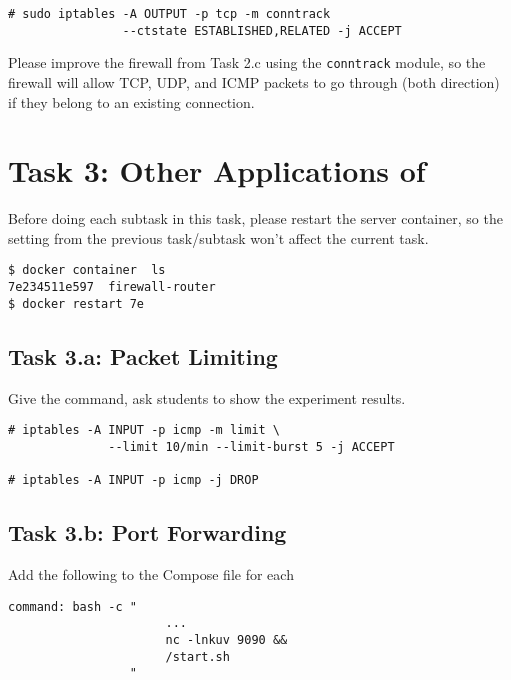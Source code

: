 \begin{lstlisting}
# sudo iptables -A OUTPUT -p tcp -m conntrack
                --ctstate ESTABLISHED,RELATED -j ACCEPT
\end{lstlisting}


Please improve the firewall from Task 2.c using the \texttt{conntrack} module, 
so the firewall will allow TCP, UDP, and ICMP packets to go through (both direction)
if they belong to an existing connection. 

 



\section{Task 3: Other Applications of \iptables}

Before doing each subtask in this task, please 
restart the server container, so the setting from the 
previous task/subtask won't affect the current task. 


\begin{lstlisting}
$ docker container  ls
7e234511e597  firewall-router
$ docker restart 7e
\end{lstlisting}



\subsection{Task 3.a: Packet Limiting}


Give the command, ask students to show the experiment results. 

\begin{lstlisting}
# iptables -A INPUT -p icmp -m limit \
              --limit 10/min --limit-burst 5 -j ACCEPT

# iptables -A INPUT -p icmp -j DROP
\end{lstlisting}
 

\subsection{Task 3.b: Port Forwarding}


Add the following to the Compose file for each 
\begin{lstlisting}
command: bash -c "
                      ...
                      nc -lnkuv 9090 &&
                      /start.sh
                 "
\end{lstlisting}



